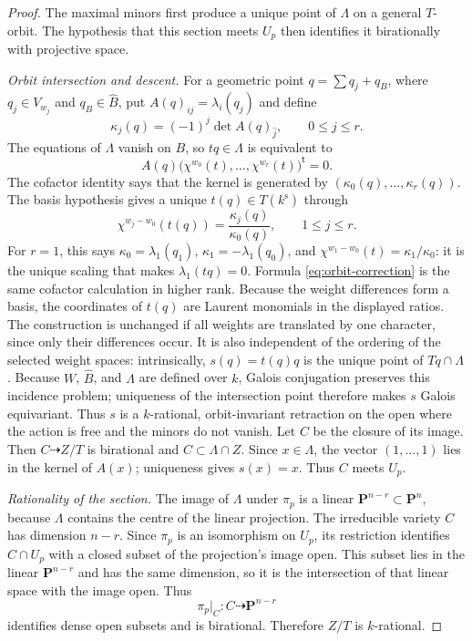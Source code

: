 \documentclass[11pt]{article}
\theoremstyle{remark}
\newcommand{\PP}{\mathbf P}
\newcommand{\ks}{k^{\mathrm s}}
\begin{document}
\begin{proof}
The maximal minors first produce a unique point of \(\Lambda\) on a general
\(T\)-orbit.  The hypothesis that this section meets \(U_p\) then identifies
it birationally with projective space.

\emph{Orbit intersection and descent.}
For a geometric point \(q=\sum q_j+q_B\), where \(q_j\in V_{w_j}\) and
\(q_B\in\widehat B\), put \(A(q)_{ij}=\lambda_i(q_j)\) and define
\begin{equation}
 \kappa_j(q)=(-1)^j\det A(q)_{\widehat j},\qquad 0\leq j\leq r.
 \label{eq:signed-minors}
\end{equation}
The equations of \(\Lambda\) vanish on \(B\), so \(tq\in\Lambda\) is
equivalent to
\[
 A(q)\bigl(\chi^{w_0}(t),\ldots,\chi^{w_r}(t)\bigr)^{\mathsf t}=0.
\]
The cofactor identity says that the kernel is generated by
\((\kappa_0(q),\ldots,\kappa_r(q))\).  The basis hypothesis gives a unique
\(t(q)\in T(\ks)\) through
\begin{equation}
 \chi^{w_j-w_0}(t(q))=\frac{\kappa_j(q)}{\kappa_0(q)},
 \qquad 1\leq j\leq r.
 \label{eq:orbit-correction}
\end{equation}
For \(r=1\), this says
\(\kappa_0=\lambda_1(q_1)\),
\(\kappa_1=-\lambda_1(q_0)\), and
\(\chi^{w_1-w_0}(t)=\kappa_1/\kappa_0\): it is the unique scaling that makes
\(\lambda_1(tq)=0\).  Formula \eqref{eq:orbit-correction} is the same
cofactor calculation in higher rank.
Because the weight differences form a basis, the coordinates of \(t(q)\) are
Laurent monomials in the displayed ratios.  The construction is
unchanged if all weights are translated by one character, since only their
differences occur.  It is also independent of the ordering of the selected
weight spaces: intrinsically, \(s(q)=t(q)q\) is the unique point of
\(Tq\cap\Lambda\).  Because \(W\), \(\widehat B\), and \(\Lambda\) are defined
over \(k\), Galois conjugation preserves this incidence problem; uniqueness of
the intersection point therefore makes \(s\) Galois equivariant.  Thus \(s\) is
a \(k\)-rational, orbit-invariant retraction on the open where the action is
free and the minors do not vanish.  Let \(C\) be the closure of its image.
Then \(C\dashrightarrow Z/T\) is birational and
\(C\subset\Lambda\cap Z\).  Since \(x\in\Lambda\), the vector
\((1,\ldots,1)\) lies in the kernel of \(A(x)\); uniqueness gives
\(s(x)=x\).  Thus \(C\) meets \(U_p\).

\emph{Rationality of the section.}
The image of \(\Lambda\) under \(\pi_p\) is a linear
\(\PP^{n-r}\subset\PP^n\), because \(\Lambda\) contains the centre of the
linear projection.  The irreducible variety \(C\) has dimension \(n-r\).
Since \(\pi_p\) is an isomorphism on \(U_p\), its restriction identifies
\(C\cap U_p\) with a closed subset of the projection's image open.
This subset lies in the linear \(\PP^{n-r}\) and has the same dimension,
so it is the intersection of that linear space with the image open.
Thus
\begin{equation}
 \pi_p|_C:C\dashrightarrow\PP^{n-r}
 \label{eq:restricted-tangent-projection}
\end{equation}
identifies dense open subsets and is birational.  Therefore \(Z/T\) is
\(k\)-rational.


\end{proof}
\end{document}
